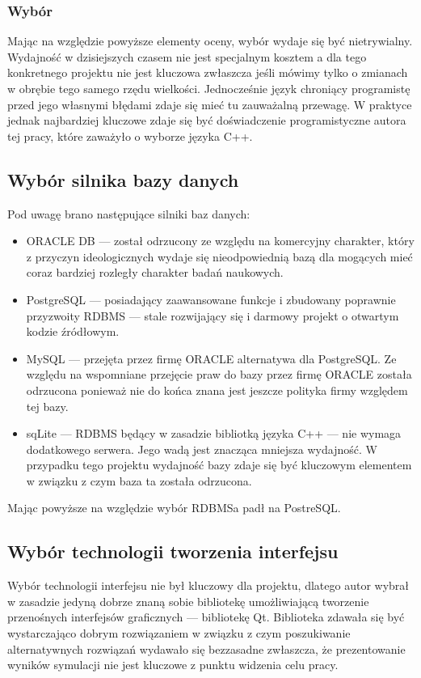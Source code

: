{\subsubsection{Wybór}
\par{
Mając na względzie powyższe elementy oceny, wybór wydaje się być nietrywialny. Wydajność w dzisiejszych czasem nie jest specjalnym kosztem a dla tego konkretnego projektu nie jest kluczowa zwłaszcza jeśli mówimy tylko o zmianach w obrębie tego samego rzędu wielkości. Jednocześnie język chroniący programistę przed jego własnymi błędami zdaje się mieć tu zauważalną przewagę. W praktyce jednak najbardziej kluczowe zdaje się być doświadczenie programistyczne autora tej pracy, które zaważyło o wyborze języka C++.
}

\subsection{Wybór silnika bazy danych}
\par{
Pod uwagę brano następujące silniki baz danych:
\begin{itemize}
\item ORACLE DB --- został odrzucony ze względu na komercyjny charakter, który z przyczyn ideologicznych wydaje się nieodpowiednią bazą dla mogących mieć coraz bardziej rozległy charakter badań naukowych.
\item PostgreSQL --- posiadający zaawansowane funkcje i zbudowany poprawnie przyzwoity RDBMS --- stale rozwijający się i darmowy projekt o otwartym kodzie źródłowym.
\item MySQL --- przejęta przez firmę ORACLE alternatywa dla PostgreSQL. Ze względu na wspomniane przejęcie praw do bazy przez firmę ORACLE została odrzucona ponieważ nie do końca znana jest jeszcze polityka firmy względem tej bazy.
\item sqLite --- RDBMS będący w zasadzie bibliotką języka C++ --- nie wymaga dodatkowego serwera. Jego wadą jest znacząca mniejsza wydajność. W przypadku tego projektu wydajność bazy zdaje się być kluczowym elementem w związku z czym baza ta została odrzucona.
\end{itemize}
Mając powyższe na względzie wybór RDBMSa padł na PostreSQL.
}

\subsection{Wybór technologii tworzenia interfejsu}
\par{
Wybór technologii interfejsu nie był kluczowy dla projektu, dlatego autor wybrał w zasadzie jedyną dobrze znaną sobie bibliotekę umożliwiającą tworzenie przenośnych interfejsów graficznych --- bibliotekę Qt. Biblioteka zdawała się być wystarczająco dobrym rozwiązaniem w związku z czym poszukiwanie alternatywnych rozwiązań wydawało się bezzasadne zwłaszcza, że prezentowanie wyników symulacji nie jest kluczowe z punktu widzenia celu pracy.
}

}
